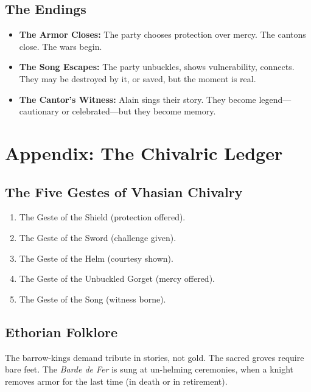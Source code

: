 \documentclass[11pt,twoside]{book}
\begin{document}
\section{The Endings}
\begin{itemize}
  \item \textbf{The Armor Closes:} The party chooses protection over mercy.  The cantons close.  The wars begin.
  \item \textbf{The Song Escapes:} The party unbuckles, shows vulnerability, connects.  They may be destroyed by it, or saved, but the moment is real.
  \item \textbf{The Cantor's Witness:} Alain sings their story.  They become legend---cautionary or celebrated---but they become memory.
\end{itemize}

\chapter{Appendix: The Chivalric Ledger}\label{ch:appendix}

\section{The Five Gestes of Vhasian Chivalry}
\begin{enumerate}
  \item The Geste of the Shield (protection offered).
  \item The Geste of the Sword (challenge given).
  \item The Geste of the Helm (courtesy shown).
  \item The Geste of the Unbuckled Gorget (mercy offered).
  \item The Geste of the Song (witness borne).
\end{enumerate}

\section{Ethorian Folklore}
The barrow-kings demand tribute in stories, not gold.  The sacred groves require bare feet.  The \emph{Barde de Fer} is sung at un-helming ceremonies, when a knight removes armor for the last time (in death or in retirement).
\end{document}
